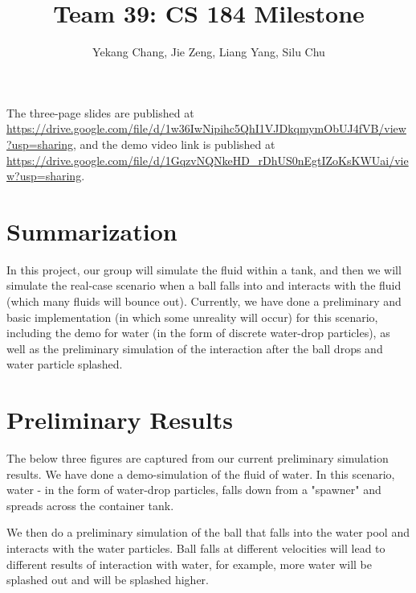 \documentclass{article}
\title{Team 39: CS 184 Milestone}
\author{Yekang Chang, Jie Zeng, Liang Yang, Silu Chu}
\begin{document}
\maketitle

The three-page slides are published at \url{https://drive.google.com/file/d/1w36IwNipihc5QhI1VJDkqmymObUJ4fVB/view?usp=sharing}, and the demo video link is published at \url{https://drive.google.com/file/d/1GqzvNQNkeHD_rDhUS0nEgtIZoKsKWUai/view?usp=sharing}.

\section{Summarization}

\hspace*{1em}In this project, our group will simulate the fluid within a tank, and then we will simulate the real-case scenario when a ball falls into and interacts with the fluid (which many fluids will bounce out). Currently, we have done a preliminary and basic implementation (in which some unreality will occur) for this scenario, including the demo for water (in the form of discrete water-drop particles), as well as the preliminary simulation of the interaction after the ball drops and water particle splashed. 

\section{Preliminary Results}

\hspace*{1em}The below three figures are captured from our current preliminary simulation results. We have done a demo-simulation of the fluid of water. In this scenario, water - in the form of water-drop particles, falls down from a "spawner" and spreads across the container tank. 

\noindent\hspace*{1em} We then do a preliminary simulation of the ball that falls into the water pool and interacts with the water particles. Ball falls at different velocities will lead to different results of interaction with water, for example, more water will be splashed out and will be splashed higher. 
\end{document}
